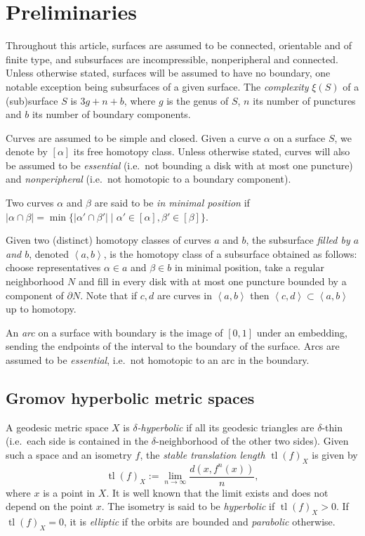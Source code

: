\documentclass{amsart}
\newcommand{\st}{\;|\;}
\newcommand{\tl}[1]{\operatorname{tl}(#1)}
\newcommand{\dist}{d}
\newcommand{\Span}[1]{\left\langle #1\right\rangle}
\theoremstyle{definition}
\begin{document}
\section{Preliminaries}\label{sec:prelim}

Throughout this article, surfaces are assumed to be connected, orientable and of finite type, and subsurfaces are incompressible, nonperipheral and connected. Unless otherwise stated, surfaces will be assumed to have no boundary, one notable exception being subsurfaces of a given surface. The \emph{complexity} \(\xi(S)\) of a (sub)surface \(S\) is \(3g+n+b\), where \(g\) is the genus of \(S\), \(n\) its number of punctures and \(b\) its number of boundary components.

Curves are assumed to be simple and closed. Given a curve \(\alpha\) on a surface \(S\), we denote by \([\alpha]\) its free homotopy class. Unless otherwise stated, curves will also be assumed to be \emph{essential} (i.e.\ not bounding a disk with at most one puncture) and \emph{nonperipheral} (i.e.\ not homotopic to a boundary component).

Two curves \(\alpha\) and \(\beta\) are said to be \emph{in minimal position} if \(|\alpha\cap\beta|=\min\{|\alpha'\cap\beta'|\st \alpha'\in [\alpha], \beta'\in [\beta]\}.\)

Given two (distinct) homotopy classes of curves \(a\) and \(b\), the subsurface \emph{filled by \(a\) and \(b\)}, denoted \(\Span{a,b}\), is the homotopy class of a subsurface obtained as follows: choose representatives \(\alpha\in a\) and \(\beta\in b\) in minimal position, take a regular neighborhood \(N\) and fill in every disk with at most one puncture bounded by a component of \(\partial N\). Note that if $c,d$ are curves in $\Span{a,b}$ then $\Span{c,d} \subset \Span{a,b}$ up to homotopy.

An \emph{arc} on a surface with boundary is the image of \([0,1]\) under an embedding, sending the endpoints of the interval to the boundary of the surface. Arcs are assumed to be \emph{essential}, i.e.\ not homotopic to an arc in the boundary.

\subsection*{Gromov hyperbolic metric spaces}
A geodesic metric space \(X\) is \emph{\(\delta\)-hyperbolic} if all its geodesic triangles are \(\delta\)-thin (i.e.\ each side is contained in the \(\delta\)-neighborhood of the other two sides). Given such a space and an isometry \(f\), the \emph{stable translation length} \(\tl{f}_X\) is given by
\[\tl{f}_X:=\lim_{n\to\infty}\frac{\dist(x,f^n(x))}{n},\]
where \(x\) is a point in \(X\). It is well known that the limit exists and does not depend on the point \(x\). The isometry is said to be \emph{hyperbolic} if \(\tl{f}_X>0\). If \(\tl{f}_X=0\), it is \emph{elliptic} if the orbits are bounded and \emph{parabolic} otherwise.
\end{document}
